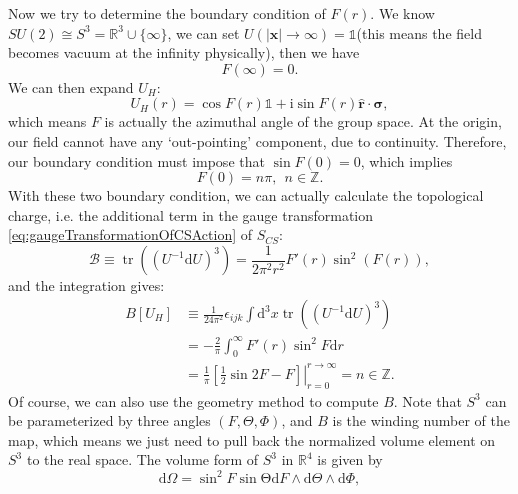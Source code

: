 \documentclass{book}
\begin{document}
Now we try to determine the boundary condition of $F( r)$. We know $SU( 2) \cong S^{3} =\mathbb{R}^{3} \cup \{\infty \}$, we can set $U(| \boldsymbol{x}| \rightarrow \infty )=\mathds{1}$(this means the field becomes vacuum at the infinity physically), then we have
\begin{equation*}
F( \infty ) =0.
\end{equation*}
We can then expand $U_{H}$:
\begin{equation*}
U_{H}( r) =\cos F( r)\mathds{1} +\mathrm{i}\sin F( r)\hat{\boldsymbol{r}} \cdot \boldsymbol{\sigma } ,
\end{equation*}
which means $F$ is actually the azimuthal angle of the group space. At the origin, our field cannot have any `out-pointing' component, due to continuity. Therefore, our boundary condition must impose that $\sin F(0)=0$, which implies
\begin{equation*}
F(0)=n\pi ,\ \ n\in \mathbb{Z} .
\end{equation*}
With these two boundary condition, we can actually calculate the topological charge, i.e. the additional term in the gauge transformation \eqref{eq:gaugeTransformationOfCSAction} of $S_{CS}$:
\begin{equation*}
\mathcal{B} \equiv \operatorname{tr} ((U^{-1} \mathrm{d} U)^{3} )=\frac{1}{2\pi ^{2} r^{2}} F'( r)\sin^{2}( F( r)) ,
\end{equation*}
and the integration gives:
\begin{equation}
\begin{aligned}
B[ U_{H}] & \equiv \frac{1}{24\pi ^{2}} \epsilon _{ijk}\int \mathrm{d}^{3} x\operatorname{tr} ((U^{-1} \mathrm{d} U)^{3} )\\
 & =-\frac{2}{\pi }\int _{0}^{\infty } F'( r)\sin^{2} F\mathrm{d} r\\
 & =\frac{1}{\pi }\left. \left[\frac{1}{2}\sin 2F-F\right]\right| _{r=0}^{r\rightarrow \infty } =n\in \mathbb{Z} .
\end{aligned}
\label{eq:windingNumberOfU}
\end{equation}
Of course, we can also use the geometry method to compute $B$. Note that $S^{3}$ can be parameterized by three angles $( F,\Theta ,\Phi )$, and $B$ is the winding number of the map, which means we just need to pull back the normalized volume element on $S^{3}$ to the real space. The volume form of $S^{3}$ in $\mathbb{R}^{4}$ is given by
\begin{equation*}
\mathrm{d} \Omega =\sin^{2} F\sin\mathrm{\Theta d} F\land \mathrm{d} \Theta \land \mathrm{d} \Phi ,
\end{equation*}
\end{document}
